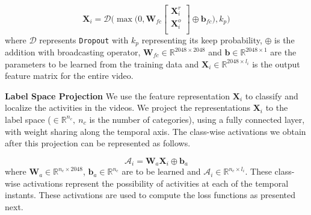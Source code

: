 \documentclass[runningheads]{llncs}
\begin{document}
\begin{equation}
\boldsymbol{X}_i = \mathcal{D}\Big( \max\Big(0,\boldsymbol{W}_{fc}
\begin{bmatrix}
\boldsymbol{X}_i^r \\
\boldsymbol{X}_i^o \\
\end{bmatrix} \oplus \boldsymbol{b}_{fc}\Big),k_p
\Big)
\label{featrep}
\end{equation}
where $\mathcal{D}$ represents \texttt{Dropout} with $k_p$ representing its keep probability, $\oplus$ is the addition with broadcasting operator,  $\boldsymbol{W}_{fc} \in \mathbb{R} ^{2048 \times 2048}$ and $\boldsymbol{b} \in \mathbb{R}^{2048 \times 1}$ are the parameters to be learned from the training data and $\boldsymbol{X}_i \in \mathbb{R}^{2048 \times l_i}$ is the output feature matrix for the entire video.

\textbf{Label Space Projection}
We use the feature representation $\boldsymbol{X}_i$ to classify and localize the activities in the videos. We project the representations $\boldsymbol{X}_i$ to the label space ($\in \mathbb{R}^{n_c}, \ n_c$ is the number of categories), using a fully connected layer, with weight sharing along the temporal axis. The class-wise activations we obtain after this projection can be represented as follows.

\begin{equation}
\boldsymbol{\mathcal{A}}_i = \boldsymbol{W}_{a}\boldsymbol{X}_i \oplus \boldsymbol{b}_a
\label{act}
\end{equation}
where $\boldsymbol{W}_a \in \mathbb{R}^{n_c \times 2048}$, $\boldsymbol{b}_a \in \mathbb{R}^{n_c}$ are to be learned and $\boldsymbol{\mathcal{A}}_i \in \mathbb{R}^{n_c \times l_i}$. These class-wise activations represent the possibility of activities at each of the temporal instants. These activations are used to compute the loss functions as presented next. 
\end{document}
